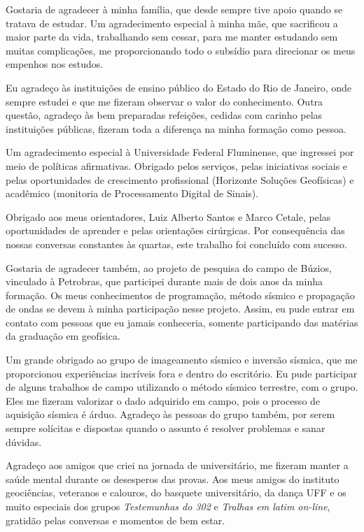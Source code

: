 \documentclass[
	12pt,				%
	openright,			%
	oneside,			%
	a4paper,			%
	english,			%
	brazil				%
	]{abntex2}
\begin{document}
\begin{agradecimentos}
	
	Gostaria de agradecer à minha família, que desde sempre tive apoio quando se tratava de estudar. Um agradecimento especial à minha mãe, que sacrificou a maior parte da vida, trabalhando sem cessar, para me manter estudando sem muitas complicações, me proporcionando todo o subsídio para direcionar os meus empenhos nos estudos.
	
	Eu agradeço às instituições de ensino público do Estado do Rio de Janeiro, onde sempre estudei e que me fizeram observar o valor do conhecimento. Outra questão, agradeço às bem preparadas refeições, cedidas com carinho pelas instituições públicas, fizeram toda a diferença na minha formação como pessoa.    
	
	Um agradecimento especial à Universidade Federal Fluminense, que ingressei por meio de políticas afirmativas. Obrigado pelos serviços, pelas iniciativas sociais e pelas oportunidades de crescimento profissional (Horizonte Soluções Geofísicas) e acadêmico (monitoria de Processamento Digital de Sinais). 

	Obrigado aos meus orientadores, Luiz Alberto Santos e Marco Cetale, pelas oportunidades de aprender e pelas orientações cirúrgicas. Por consequência das nossas conversas constantes às quartas, este trabalho foi concluído com sucesso.   
	
	Gostaria de agradecer também, ao projeto de pesquisa do campo de Búzios, vinculado à Petrobras, que participei durante mais de dois anos da minha formação. Os meus conhecimentos de programação, método sísmico e propagação de ondas se devem à minha participação nesse projeto. Assim, eu pude entrar em contato com pessoas que eu jamais conheceria, somente participando das matérias da graduação em geofísica.  
	
	Um grande obrigado ao grupo de imageamento sísmico e inversão sísmica, que me proporcionou experiências incríveis fora e dentro do escritório. Eu pude participar de alguns trabalhos de campo utilizando o método sísmico terrestre, com o grupo. Eles me fizeram valorizar o dado adquirido em campo, pois o processo de aquisição sísmica é árduo. Agradeço às pessoas do grupo também, por serem sempre solícitas e dispostas quando o assunto é resolver problemas e sanar dúvidas. 
	
	Agradeço aos amigos que criei na jornada de universitário, me fizeram manter a saúde mental durante os desesperos das provas. Aos meus amigos do instituto geociências, veteranos e calouros, do basquete universitário, da dança UFF e os muito especiais dos grupos \textit{Testemunhas do 302} e \textit{Tralhas em latim on-line}, gratidão pelas conversas e momentos de bem estar.  
	 
\end{agradecimentos}
\end{document}
